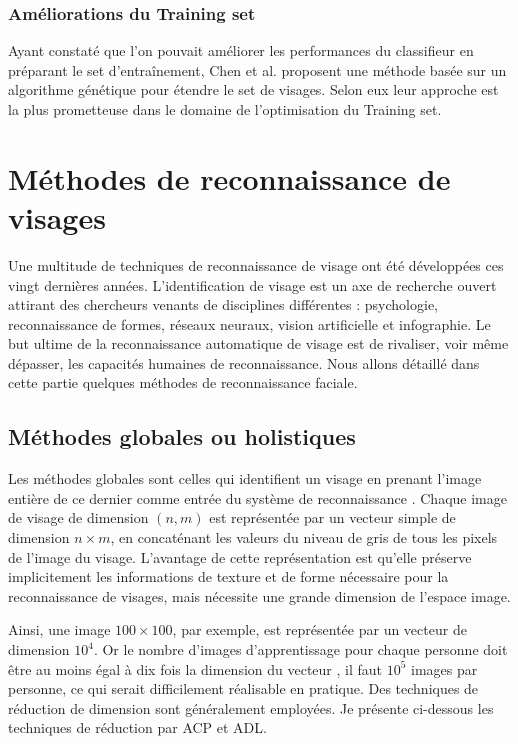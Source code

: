 	\subsubsection{Améliorations du Training set}
	Ayant constaté que l'on pouvait améliorer les performances du classifieur en préparant le set d'entraînement, Chen et al. \citep{CHEN} proposent une méthode basée sur un algorithme génétique pour étendre le set de visages. Selon eux leur approche est la plus prometteuse  dans le domaine de l'optimisation du Training set.
	
\section{Méthodes de reconnaissance de visages}

Une multitude de techniques de reconnaissance de visage ont été développées ces vingt dernières années.  L'identification  de  visage  est  un  axe  de  recherche  ouvert  attirant  des  chercheurs venants  de  disciplines  différentes  :  psychologie,  reconnaissance  de  formes, réseaux neuraux, vision artificielle et infographie. Le but ultime de la reconnaissance automatique de visage est  de  rivaliser,  voir  même  dépasser,  les  capacités  humaines  de reconnaissance. Nous allons détaillé dans cette partie quelques méthodes de reconnaissance faciale.

\subsection{Méthodes globales ou holistiques}
Les méthodes globales sont celles qui identifient un visage en prenant l'image entière de ce dernier comme entrée du système de reconnaissance \citep{Sou12}. Chaque image de visage de dimension $(n,m)$ est représentée 
par un vecteur simple de dimension $n\times m$, en concaténant les valeurs du niveau de gris de tous les pixels  de l'image du visage. L'avantage de cette représentation est qu'elle préserve implicitement les informations de texture et de forme nécessaire pour la reconnaissance de visages, mais nécessite une grande dimension de l'espace image. 

Ainsi, une image $100\times 100$, par exemple, est représentée par un vecteur de dimension $10^4$. Or le nombre d'images d'apprentissage pour chaque personne doit être au moins égal à dix fois la dimension du vecteur \citep{Jai}, il faut $10^5$ images  par  personne, ce qui serait difficilement réalisable en pratique.  Des techniques de réduction de  dimension sont généralement employées. Je présente ci-dessous les techniques de réduction par ACP et ADL.

